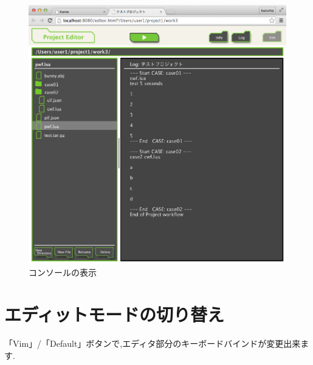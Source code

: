 \documentclass[a4paper,10pt,oneside]{jsbook}
\begin{document}
\begin{figure}[htbp]
	\begin{center}
		\includegraphics[width=12.0cm]{image/projeditor_004.png}
	\end{center}
	\caption{コンソールの表示}
	\label{fig:projeditor_comsole}
\end{figure}

\section{エディットモードの切り替え}
「Vim」/「Default」ボタンで,エディタ部分のキーボードバインドが変更出来ます.
\end{document}
